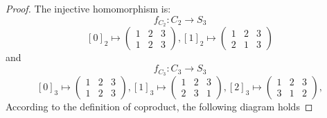 \documentclass[a4paper, pdf, 12pt]{article}
\begin{document}
\begin{proof}
  The injective homomorphism is:
  $$
    f_{C_2}: C_2\rightarrow S_3
  $$
  $$
    \left[0\right]_{2}\mapsto \begin{pmatrix}
      1 & 2 & 3 \\
      1 & 2 & 3
    \end{pmatrix},
    \left[1\right]_{2}\mapsto \begin{pmatrix}
      1 & 2 & 3 \\
      2 & 1 & 3
    \end{pmatrix}
  $$ and
  $$
    f_{C_3}: C_3\rightarrow S_3
  $$
  $$
    \left[0\right]_{3}\mapsto \begin{pmatrix}
      1 & 2 & 3 \\
      1 & 2 & 3
    \end{pmatrix},
    \left[1\right]_{3}\mapsto \begin{pmatrix}
      1 & 2 & 3 \\
      2 & 3 & 1
    \end{pmatrix},
    \left[2\right]_{3}\mapsto \begin{pmatrix}
      1 & 2 & 3 \\
      3 & 1 & 2
    \end{pmatrix},
  $$
  According to the definition of coproduct, the following diagram holds


\end{proof}
\end{document}

